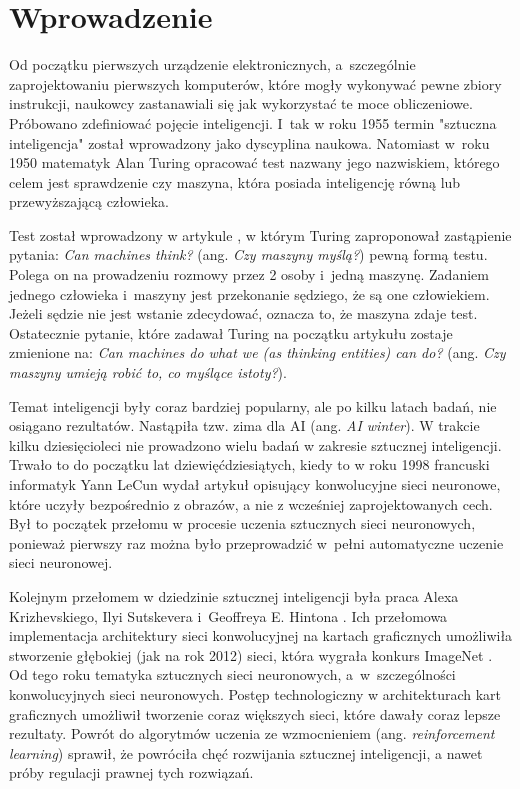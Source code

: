 \chapter{Wprowadzenie}
\label{cha:wprowadzenie}

Od początku pierwszych urządzenie elektronicznych, a~szczególnie 
zaprojektowaniu pierwszych komputerów, które mogły wykonywać pewne zbiory 
instrukcji, naukowcy zastanawiali się jak wykorzystać te moce obliczeniowe. 
Próbowano zdefiniować pojęcie inteligencji. I~tak w roku 1955 termin "sztuczna 
inteligencja" został wprowadzony jako dyscyplina naukowa. Natomiast w~roku 1950 
matematyk Alan Turing opracować test nazwany jego nazwiskiem, którego celem 
jest sprawdzenie czy maszyna, która posiada inteligencję równą lub 
przewyższającą człowieka.

Test został wprowadzony w artykule \cite{turing_test}, w którym Turing 
zaproponował zastąpienie pytania: \textit{Can machines think?} (ang. 
\textit{Czy maszyny myślą?}) pewną formą testu. Polega on na prowadzeniu 
rozmowy przez 2 osoby i~jedną maszynę. Zadaniem jednego człowieka i~maszyny 
jest przekonanie sędziego, że są one człowiekiem. Jeżeli sędzie nie jest 
wstanie zdecydować, oznacza to, że maszyna zdaje test. Ostatecznie pytanie, 
które zadawał Turing  na początku artykułu zostaje zmienione na: \textit{Can 
machines do what we (as thinking entities) can do?} (ang. \textit{Czy maszyny 
umieją robić to, co myślące istoty?}).

Temat inteligencji były coraz bardziej popularny, ale po kilku latach badań, 
nie osiągano rezultatów. Nastąpiła tzw. zima dla AI (ang. \textit{AI winter}). 
W trakcie kilku dziesięcioleci nie prowadzono wielu badań w zakresie sztucznej 
inteligencji. Trwało to do początku lat dziewięćdziesiątych, kiedy to w roku 
1998 francuski informatyk Yann LeCun wydał artykuł \cite{lecunn_cnn} opisujący 
konwolucyjne sieci neuronowe, które uczyły bezpośrednio z obrazów, a nie z 
wcześniej zaprojektowanych cech. Był to początek przełomu w procesie uczenia 
sztucznych sieci neuronowych, ponieważ pierwszy raz można było przeprowadzić 
w~pełni automatyczne uczenie sieci neuronowej.

Kolejnym przełomem w dziedzinie sztucznej inteligencji była praca Alexa 
Krizhevskiego, Ilyi Sutskevera i~Geoffreya E. Hintona \cite{alexnet}. Ich 
przełomowa implementacja architektury sieci konwolucyjnej na kartach 
graficznych umożliwiła stworzenie głębokiej (jak na rok 2012) sieci, która 
wygrała konkurs ImageNet \cite{imagenet_competition}. Od tego roku tematyka 
sztucznych sieci neuronowych, a~w~szczególności konwolucyjnych sieci 
neuronowych. Postęp technologiczny w architekturach kart graficznych umożliwił 
tworzenie coraz większych sieci, które dawały coraz lepsze rezultaty. Powrót do 
algorytmów uczenia ze wzmocnieniem (ang. \textit{reinforcement learning}) 
sprawił, że powróciła chęć rozwijania sztucznej inteligencji, a nawet próby 
regulacji prawnej tych rozwiązań.

